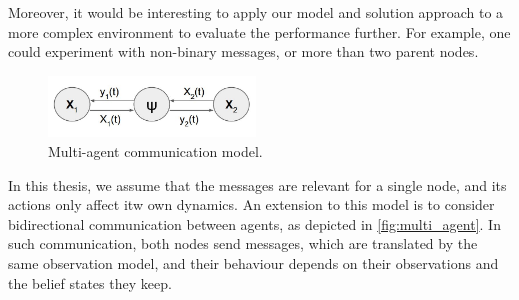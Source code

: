 Moreover, it would be interesting to apply our model and solution approach to a more complex environment to evaluate the performance further. For example, one could experiment with non-binary messages, or more than two parent nodes.\\
\vspace{-13pt}
\begin{figure}
	\begin{center}
		\vspace{-13pt}
		\includegraphics[width=5.5cm]{figures/multi-agent}
		\caption[Multi-agent communication model]{Multi-agent communication model.}
		\label{fig:multi_agent}
	\end{center}
\end{figure}
In this thesis, we assume that the messages are relevant for a single node, and its actions only affect itw own dynamics. An extension to this model is to consider bidirectional communication between agents, as depicted in \autoref{fig:multi_agent}. In such communication, both nodes send messages, which are translated by the same observation model, and their behaviour depends on their observations and the belief states they keep. 

